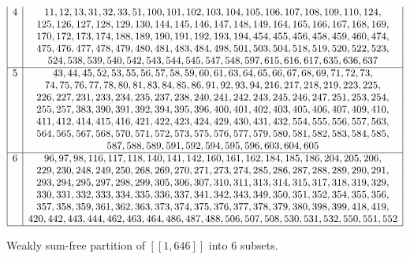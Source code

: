 \begin{table}[H]
\[\begin{array}{|*{2}{c|}}
		4 & 11, 12, 13, 31, 32, 33, 51, 100, 101, 102, 103, 104, 105, 106, 107, 108, 109, 110, 124, \\
		& 125, 126, 127, 128, 129, 130, 144, 145, 146, 147, 148, 149, 164, 165, 166, 167, 168, 169, \\
		& 170, 172, 173, 174, 188, 189, 190, 191, 192, 193, 194, 454, 455, 456, 458, 459, 460, 474, \\
		& 475, 476, 477, 478, 479, 480, 481, 483, 484, 498, 501, 503, 504, 518, 519, 520, 522, 523, \\
		& 524, 538, 539, 540, 542, 543, 544, 545, 547, 548, 597, 615, 616, 617, 635, 636, 637 \\
		\hline
		5 & 43, 44, 45, 52, 53, 55, 56, 57, 58, 59, 60, 61, 63, 64, 65, 66, 67, 68, 69, 71, 72, 73, \\
		& 74, 75, 76, 77, 78, 80, 81, 83, 84, 85, 86, 91, 92, 93, 94, 216, 217, 218, 219, 223, 225, \\
		& 226, 227, 231, 233, 234, 235, 237, 238, 240, 241, 242, 243, 245, 246, 247, 251, 253, 254, \\
		& 255, 257, 383, 390, 391, 392, 394, 395, 396, 400, 401, 402, 403, 405, 406, 407, 409, 410, \\
		& 411, 412, 414, 415, 416, 421, 422, 423, 424, 429, 430, 431, 432, 554, 555, 556, 557, 563, \\ 
		& 564, 565, 567, 568, 570, 571, 572, 573, 575, 576, 577, 579, 580, 581, 582, 583, 584, 585, \\
		& 587, 588, 589, 591, 592, 594, 595, 596, 603, 604, 605 \\
		\hline
		6 & 96, 97, 98, 116, 117, 118, 140, 141, 142, 160, 161, 162, 184, 185, 186, 204, 205, 206, \\
		& 229, 230, 248, 249, 250, 268, 269, 270, 271, 273, 274, 285, 286, 287, 288, 289, 290, 291, \\
		& 293, 294, 295, 297, 298, 299, 305, 306, 307, 310, 311, 313, 314, 315, 317, 318, 319, 329, \\
		& 330, 331, 332, 333, 334, 335, 336, 337, 341, 342, 343, 349, 350, 351, 352, 354, 355, 356, \\
		& 357, 358, 359, 361, 362, 363, 373, 374, 375, 376, 377, 378, 379, 380, 398, 399, 418, 419, \\
		& 420, 442, 443, 444, 462, 463, 464, 486, 487, 488, 506, 507, 508, 530, 531, 532, 550, 551, 552 \\
		\hline
	\end{array}
	\]
	\vspace{-3ex}
	\caption{Weakly sum-free partition of \([\![ 1, 646 ]\!] \) into 6 subsets.}
	\vspace{-2ex}
	\end{table}

